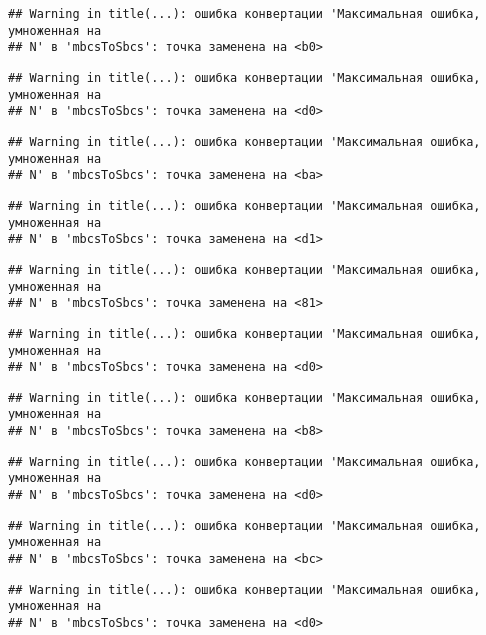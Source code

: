 \documentclass[
]{article}
\begin{document}
\begin{verbatim}
## Warning in title(...): ошибка конвертации 'Максимальная ошибка, умноженная на
## N' в 'mbcsToSbcs': точка заменена на <b0>
\end{verbatim}

\begin{verbatim}
## Warning in title(...): ошибка конвертации 'Максимальная ошибка, умноженная на
## N' в 'mbcsToSbcs': точка заменена на <d0>
\end{verbatim}

\begin{verbatim}
## Warning in title(...): ошибка конвертации 'Максимальная ошибка, умноженная на
## N' в 'mbcsToSbcs': точка заменена на <ba>
\end{verbatim}

\begin{verbatim}
## Warning in title(...): ошибка конвертации 'Максимальная ошибка, умноженная на
## N' в 'mbcsToSbcs': точка заменена на <d1>
\end{verbatim}

\begin{verbatim}
## Warning in title(...): ошибка конвертации 'Максимальная ошибка, умноженная на
## N' в 'mbcsToSbcs': точка заменена на <81>
\end{verbatim}

\begin{verbatim}
## Warning in title(...): ошибка конвертации 'Максимальная ошибка, умноженная на
## N' в 'mbcsToSbcs': точка заменена на <d0>
\end{verbatim}

\begin{verbatim}
## Warning in title(...): ошибка конвертации 'Максимальная ошибка, умноженная на
## N' в 'mbcsToSbcs': точка заменена на <b8>
\end{verbatim}

\begin{verbatim}
## Warning in title(...): ошибка конвертации 'Максимальная ошибка, умноженная на
## N' в 'mbcsToSbcs': точка заменена на <d0>
\end{verbatim}

\begin{verbatim}
## Warning in title(...): ошибка конвертации 'Максимальная ошибка, умноженная на
## N' в 'mbcsToSbcs': точка заменена на <bc>
\end{verbatim}

\begin{verbatim}
## Warning in title(...): ошибка конвертации 'Максимальная ошибка, умноженная на
## N' в 'mbcsToSbcs': точка заменена на <d0>
\end{verbatim}
\end{document}
